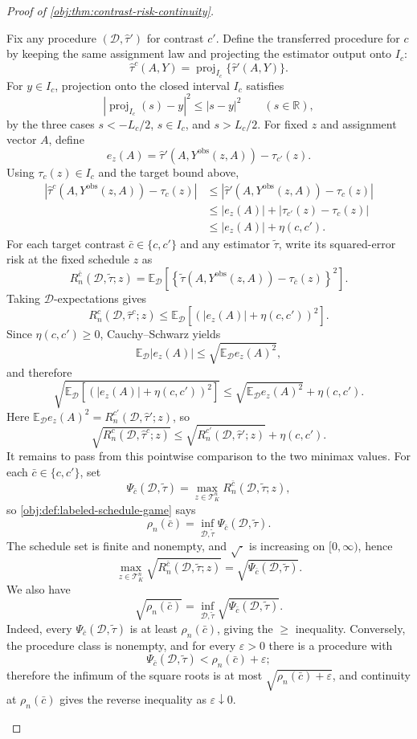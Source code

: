 \documentclass[11pt]{article}
\begin{document}
\begin{proof}[Proof of \cref{obj:thm:contrast-risk-continuity}]
\begin{enumerate}
Fix any procedure \((\mathcal D,\widehat\tau')\) for contrast \(c'\). Define the transferred procedure for \(c\) by keeping the same assignment law and projecting the estimator output onto \(I_c\):
\[
\widehat\tau^{c}(A,Y)=
\operatorname{proj}_{I_c}\{\widehat\tau'(A,Y)\}.
\]
For \(y\in I_c\), projection onto the closed interval \(I_c\) satisfies
\[
\left|\operatorname{proj}_{I_c}(s)-y\right|^2\le |s-y|^2
\qquad(s\in\mathbb R),
\]
by the three cases \(s<-L_c/2\), \(s\in I_c\), and \(s>L_c/2\). For fixed \(z\) and assignment vector \(A\), define
\[
e_z(A)=\widehat\tau'(A,Y^{\mathrm{obs}}(z,A))-\tau_{c'}(z).
\]
Using \(\tau_c(z)\in I_c\) and the target bound above,
\[
\begin{aligned}
\left|\widehat\tau^{c}(A,Y^{\mathrm{obs}}(z,A))-\tau_c(z)\right|
&\le
\left|\widehat\tau'(A,Y^{\mathrm{obs}}(z,A))-\tau_c(z)\right|  \\
&\le
|e_z(A)|+|\tau_{c'}(z)-\tau_c(z)| \\
&\le
|e_z(A)|+\eta(c,c').
\end{aligned}
\]
For each target contrast \(\bar c\in\{c,c'\}\) and any estimator \(\widetilde\tau\), write its squared-error risk at the fixed schedule \(z\) as
\[
R_n^{\bar c}(\mathcal D,\widetilde\tau;z)
=
\mathbb E_{\mathcal D}\left[
\left\{
\widetilde\tau(A,Y^{\mathrm{obs}}(z,A))-\tau_{\bar c}(z)
\right\}^2
\right].
\]
Taking \(\mathcal D\)-expectations gives
\[
R_n^c(\mathcal D,\widehat\tau^c;z)
\le
\mathbb E_{\mathcal D}\left[(|e_z(A)|+\eta(c,c'))^2\right].
\]
Since \(\eta(c,c')\ge0\), Cauchy--Schwarz yields
\[
\mathbb E_{\mathcal D}|e_z(A)|
\le
\sqrt{\mathbb E_{\mathcal D}e_z(A)^2},
\]
and therefore
\[
\sqrt{\mathbb E_{\mathcal D}\left[(|e_z(A)|+\eta(c,c'))^2\right]}
\le
\sqrt{\mathbb E_{\mathcal D}e_z(A)^2}+\eta(c,c').
\]
Here \(\mathbb E_{\mathcal D}e_z(A)^2=R_n^{c'}(\mathcal D,\widehat\tau';z)\), so
\[
\sqrt{R_n^c(\mathcal D,\widehat\tau^c;z)}
\le
\sqrt{R_n^{c'}(\mathcal D,\widehat\tau';z)}+\eta(c,c').
\]
It remains to pass from this pointwise comparison to the two minimax values.  For each \(\bar c\in\{c,c'\}\), set
\[
\Psi_{\bar c}(\mathcal D,\widetilde\tau)
=
\max_{z\in\mathcal T_K^n} R_n^{\bar c}(\mathcal D,\widetilde\tau;z),
\]
so \cref{obj:def:labeled-schedule-game} says
\[
\rho_n(\bar c)=\inf_{\mathcal D,\widetilde\tau}\Psi_{\bar c}(\mathcal D,\widetilde\tau).
\]
The schedule set is finite and nonempty, and \(\sqrt{\cdot}\) is increasing on \([0,\infty)\), hence
\[
\max_{z\in\mathcal T_K^n}\sqrt{R_n^{\bar c}(\mathcal D,\widetilde\tau;z)}
=
\sqrt{\Psi_{\bar c}(\mathcal D,\widetilde\tau)}.
\]
We also have
\[
\sqrt{\rho_n(\bar c)}
=
\inf_{\mathcal D,\widetilde\tau}\sqrt{\Psi_{\bar c}(\mathcal D,\widetilde\tau)}.
\]
Indeed, every \(\Psi_{\bar c}(\mathcal D,\widetilde\tau)\) is at least \(\rho_n(\bar c)\), giving the \(\ge\) inequality. Conversely, the procedure class is nonempty, and for every \(\varepsilon>0\) there is a procedure with
\[
\Psi_{\bar c}(\mathcal D,\widetilde\tau)<\rho_n(\bar c)+\varepsilon;
\]
therefore the infimum of the square roots is at most \(\sqrt{\rho_n(\bar c)+\varepsilon}\), and continuity at \(\rho_n(\bar c)\) gives the reverse inequality as \(\varepsilon\downarrow0\).


\end{enumerate}
\end{proof}
\end{document}
